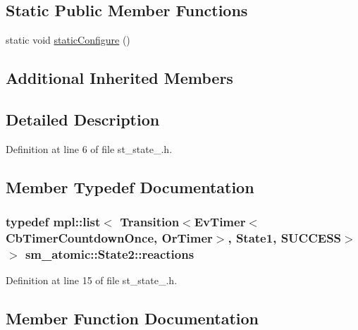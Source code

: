 \subsection*{Static Public Member Functions}
\begin{DoxyCompactItemize}
\item 
static void \hyperlink{structsm__atomic_1_1State2_ab6cafa3e8433c2d7ee10fa6fec8f3748}{static\+Configure} ()
\end{DoxyCompactItemize}
\subsection*{Additional Inherited Members}


\subsection{Detailed Description}


Definition at line 6 of file st\+\_\+state\+\_.\+h.



\subsection{Member Typedef Documentation}
\subsubsection[{\texorpdfstring{reactions}{reactions}}]{\setlength{\rightskip}{0pt plus 5cm}typedef mpl\+::list$<$ Transition$<${\bf Ev\+Timer}$<${\bf Cb\+Timer\+Countdown\+Once}, {\bf Or\+Timer}$>$, {\bf State1}, {\bf S\+U\+C\+C\+E\+SS}$>$ $>$ {\bf sm\+\_\+atomic\+::\+State2\+::reactions}}\hypertarget{structsm__atomic_1_1State2_a9436556de6be8ea64fd35707aa4bfec8}{}\label{structsm__atomic_1_1State2_a9436556de6be8ea64fd35707aa4bfec8}


Definition at line 15 of file st\+\_\+state\+\_.\+h.



\subsection{Member Function Documentation}
